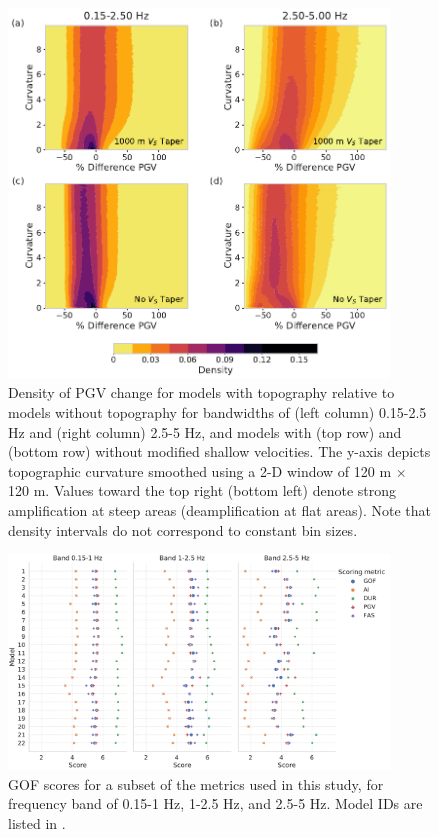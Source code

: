 \begin{figure}[!ht]
  \centering
  \includegraphics[width=0.9\textwidth,height=0.9\textheight,keepaspectratio]{figures/figure_highf_S6.pdf}
  \caption{
  Density of PGV change for models with topography relative to models without topography for bandwidths of (left column) 0.15-2.5 Hz and (right column) 2.5-5 Hz, and models with (top row) and (bottom row) without modified shallow velocities. The y-axis depicts topographic curvature smoothed using a 2-D window of 120 m $\times$ 120 m. Values toward the top right (bottom left) denote strong amplification at steep areas (deamplification at flat areas). Note that density intervals do not correspond to constant bin sizes.
  }
  \label{fig:highf-S6}
\end{figure}
\clearpage

\begin{figure}[!ht]
  \centering
  \includegraphics[width=0.9\textwidth,height=0.9\textheight,keepaspectratio]{figures/GOF_mean_SH1D_tabels.pdf}
  \caption{
  GOF scores for a subset of the metrics used in this study, for frequency band of 0.15-1 Hz, 1-2.5 Hz, and 2.5-5 Hz. Model IDs are listed in .} 
 
  \label{fig:highf-S7}
\end{figure}
\clearpage

